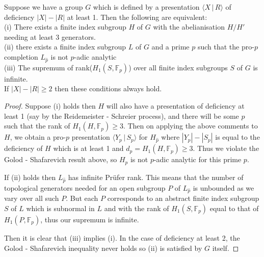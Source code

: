 \documentclass[10pt,a4paper]{amsart}
\newcommand{\F}{\mathbb{F}}
\begin{document}
     \begin{thm} \label{padan}
       Suppose  we have a group $G$
       which is defined by a presentation $\langle X\,|\,R\rangle$
       of deficiency $|X|-|R|$ at least 1. Then the following are
       equivalent:\\
              (i) There exists a finite index subgroup $H$ of $G$ with
       the abelianisation $H/H'$ needing at least 3 generators.\\
       (ii) there exists a finite
       index subgroup $L$ of $G$ and a prime $p$ such that the pro-$p$
       completion $L_{\hat{p}}$ is not $p$-adic analytic\\
       (iii) The supremum of rank($H_1(S,\F_p)$) over all finite index subgroups
       $S$ of $G$ is infinite.\\
       If $|X|-|R|\geq 2$ then these conditions always hold.
\end{thm}

       \begin{proof}
         Suppose (i) holds then $H$ will also have a presentation of
         deficiency at least 1
     (say by the Reidemeister - Schreier process),
         and there will be some $p$
         such that the rank of $H_1(H,\F_p)\geq 3$.
         Then on applying the above comments to $H$, we obtain a pro-$p$
         presentation $\langle Y_p\,|\,S_p\rangle$ for $H_{\hat{p}}$ where
         $|Y_p|-|S_p|$ is equal to the deficiency of $H$ which is at least
         1 and $d_p=H_1(H,\F_p)\geq 3$.
         Thus we violate the Golod - Shafarevich result above, so
         $H_{\hat{p}}$ is not $p$-adic analytic for this prime $p$.

      If (ii) holds then $L_{\hat{p}}$ has infinite Pr\"ufer rank. This means
      that the number of topological generators needed for an open subgroup
      $P$ of $L_{\hat{p}}$ is unbounded as we vary over all such $P$.
      But each $P$ corresponds to an abstract
      finite index subgroup $S$ of $L$ which is subnormal in $L$ and with
      the rank of $H_1(S,\F_p)$ equal to that of $H_1(P,\F_p)$, thus our
supremum is infinite.

Then it is clear that (iii) implies (i). In the case of deficiency
at least 2, the Golod - Shafarevich inequality never holds so (ii) is
satisfied by $G$ itself.
\end{proof}
\end{document}
